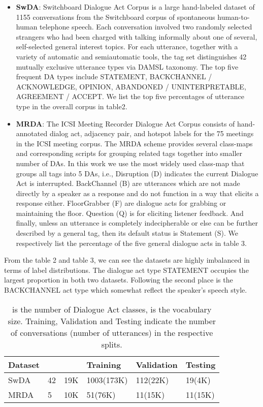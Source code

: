 \documentclass[sigconf]{acmart}
\begin{document}
\begin{itemize}
\item \textbf{SwDA}: Switchboard Dialogue Act Corpus is a large hand-labeled dataset of 1155 conversations from the Switchboard corpus of spontaneous human-to-human
telephone speech. Each conversation involved two randomly selected strangers
who had been charged with talking informally about one of several, self-selected general interest topics. For each utterance, together with a variety of automatic and semiautomatic tools, the tag set distinguishes 42 mutually
exclusive utterance types via DAMSL taxonomy. The top five frequent DA types include STATEMENT, BACKCHANNEL / ACKNOWLEDGE, OPINION, ABANDONED / UNINTERPRETABLE, AGREEMENT / ACCEPT. We list the top five percentages of utterance type in the overall corpus in table2.

\item \textbf{MRDA}: The ICSI Meeting Recorder Dialogue Act Corpus consists of hand-annotated dialog act, adjacency pair, and hotspot labels for the 75 meetings in the ICSI meeting corpus. The MRDA scheme provides several class-maps and corresponding scripts for grouping related tags together into smaller number of DAs. In this work we use the most widely used class-map that groups all tags into 5 DAs, i.e., Disruption (D) indicates the current Dialogue Act is interrupted. BackChannel (B) are utterances which are not made directly by a speaker as a response and do not function in a way that elicits a response either. FloorGrabber (F) are dialogue acts for grabbing or maintaining the floor. Question (Q) is for eliciting listener feedback. And finally, unless an utterance is completely indecipherable or else can be further described by a general tag, then its default status is Statement (S). We respectively list the percentage of the five general dialogue acts in table 3.
\end{itemize} 

From the table 2 and table 3, we can see the datasets are highly imbalanced in terms of label distributions. The dialogue act type STATEMENT occupies the largest proportion in both two datasets. Following the second place is the BACKCHANNEL act type which somewhat reflect the speaker's speech style.  

\begin{table}[t]
	\small
	\begin{tabular}{|p{0.9cm}|p{0.3cm}|p{0.5cm}|l|l|l|}
		\hline
		Dataset &  &  & Training 	& Validation & Testing	\\\hline
		SwDA	& 42	& 19K	& 1003(173K)& 112(22K)	 & 19(4K) 	\\
		MRDA	& 5		& 10K	& 51(76K)	& 11(15K)	 & 11(15K) 	\\
		\hline
	\end{tabular}
	\caption{ is the number of Dialogue Act classes,  is the vocabulary size. Training, Validation and Testing indicate the number of conversations (number of utterances) in the respective splits.}
	\label{table:datastats}
\end{table}
\end{document}
